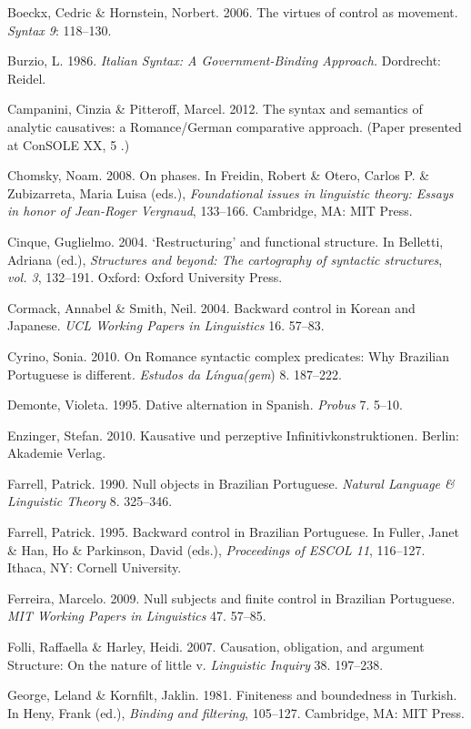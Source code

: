 \documentclass[output=paper]{langsci/langscibook}
\begin{document}
Boeckx, Cedric \& Hornstein, Norbert. 2006. The virtues of control as movement. \textit{Syntax 9}: 118–130. 

Burzio, L. 1986. \textit{Italian Syntax: A Government-Binding Approach.} Dordrecht: Reidel. 

Campanini, Cinzia \& Pitteroff, Marcel. 2012. The syntax and semantics of analytic causatives: a Romance/German comparative approach. (Paper presented at ConSOLE XX, 5 \citealt{January2012}.)

Chomsky, Noam. 2008. On phases. In Freidin, Robert \& Otero, Carlos P. \& Zubizarreta, Maria Luisa (eds.), \textit{Foundational issues in linguistic theory: Essays in honor of Jean-Roger Vergnaud}, 133–166. Cambridge, MA: MIT Press. 

Cinque, Guglielmo. 2004. ‘Restructuring’ and functional structure. In Belletti, Adriana (ed.), \textit{Structures and beyond: The cartography of syntactic structures}, \textit{vol. 3}, 132–191. Oxford: Oxford University Press.

Cormack, Annabel \& Smith, Neil. 2004. Backward control in Korean and Japanese. \textit{UCL Working Papers in Linguistics} 16. 57–83. 

Cyrino, Sonia. 2010. On Romance syntactic complex predicates: Why Brazilian Portuguese is different. \textit{Estudos da Língua(gem}) 8. 187–222.

Demonte, Violeta. 1995. Dative alternation in Spanish. \textit{Probus} 7. 5–10.

Enzinger, Stefan. 2010. Kausative und perzeptive Infinitivkonstruktionen. Berlin: Akademie Verlag. 

Farrell, Patrick. 1990. Null objects in Brazilian Portuguese. \textit{Natural Language \& Linguistic Theory} 8. 325–346. 

Farrell, Patrick. 1995. Backward control in Brazilian Portuguese. In Fuller, Janet \& Han, Ho \& Parkinson, David (eds.), \textit{Proceedings of ESCOL 11}, 116–127. Ithaca, NY: Cornell University. 

Ferreira, Marcelo. 2009. Null subjects and finite control in Brazilian Portuguese. \textit{MIT Working Papers in Linguistics} 47. 57–85. 

Folli, Raffaella \& Harley, Heidi. 2007. Causation, obligation, and argument Structure: On the nature of little v. \textit{Linguistic Inquiry} 38. 197–238. 

George, Leland \& Kornfilt, Jaklin. 1981. Finiteness and boundedness in Turkish. In Heny, Frank (ed.), \textit{Binding and filtering}, 105–127. Cambridge, MA: MIT Press. 
\end{document}
